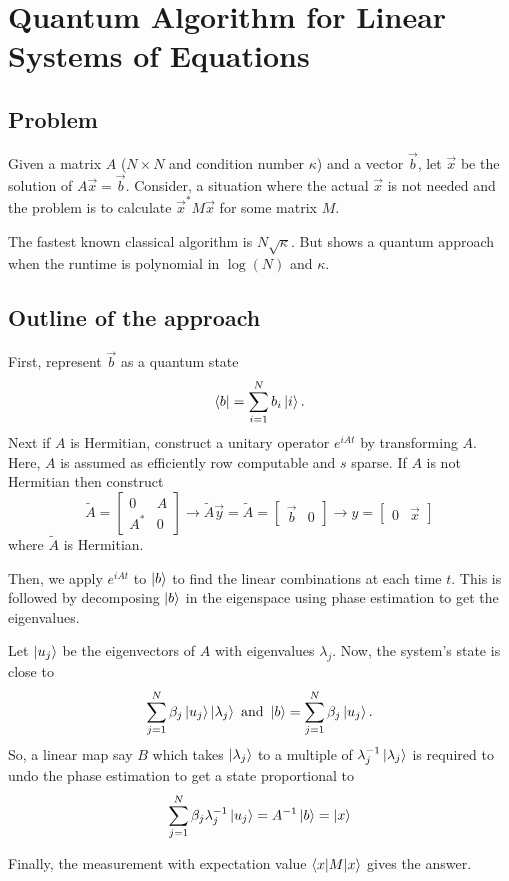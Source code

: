 \section{Quantum Algorithm for Linear Systems of Equations}{\label{sec:qalse}}
\subsection{Problem}
Given a matrix $A$ ($N\times N$ and condition number $\kappa$) and a vector $\vec{b}$, let $\vec{x}$ be the solution of $A\vec{x} = \vec{b}$. Consider, a situation where the actual $\vec{x}$ is not needed and the problem is to calculate $\vec{x}^*M\vec{x}$ for some matrix $M$.

The fastest known classical algorithm is $N\sqrt{\kappa}$. But \cite{Harrow_2009} shows a quantum approach when the runtime is polynomial in $\log(N)$ and $\kappa$.
\subsection{Outline of the approach}
First, represent $\vec{b}$ as a quantum state
\[\bra{b}=\sum_{i=1}^N b_i\ket{i}.\]
Next if $A$ is Hermitian, construct a unitary operator $e^{iAt}$ by transforming $A$. Here, $A$ is assumed as efficiently row computable and $s$ sparse.
If $A$ is not Hermitian then construct \[\tilde{A}=\begin{bmatrix}
0 & A\\
A^* & 0
\end{bmatrix}\rightarrow \tilde{A} \vec{y}= \tilde{A}=\begin{bmatrix}
\vec{b}&0
\end{bmatrix}\rightarrow y = \begin{bmatrix}
0&\vec{x}
\end{bmatrix}\]
where $\tilde{A}$ is Hermitian.

Then, we apply $e^{iAt}$ to $\ket{b}$ to find the linear combinations at each time $t$. 
This is followed by decomposing $\ket{b}$ in the eigenspace using phase estimation \cite{Cleve_1998} to get the eigenvalues.

Let $\ket{u_j}$ be the eigenvectors of $A$ with eigenvalues $\lambda_j$.
Now, the system's state is close to \[\sum_{j=1}^N \beta_j\ket{u_j}\ket{\lambda_j} \text{ and } \ket{b} =\sum_{j=1}^N \beta_j\ket{u_j}.\]
So, a linear map say $B$ which takes $\ket{\lambda_j}$ to a multiple of $\lambda_j^{-1}\ket{\lambda_j}$ is required to undo the phase estimation to get a state proportional to \[\sum_{j=1}^N \beta_j\lambda_j^{-1}\ket{u_j} = A^{-1}\ket{b} = \ket{x}\]

Finally, the measurement with expectation value $\braket{x|M|x}$ gives the answer.
